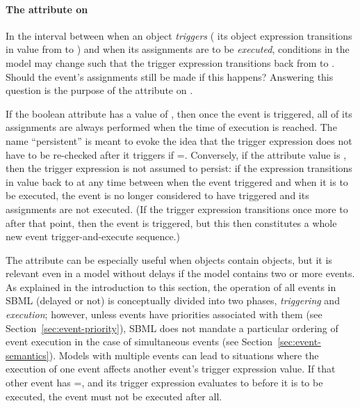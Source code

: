 \paragraph{The  attribute on }
\label{sec:trigger-persistent}

In the interval between when an \Event object \emph{triggers} (\ie
its \Trigger object expression transitions in value from
 to ) and when its assignments are to be
\emph{executed}, conditions in the model may change such that the
trigger expression transitions back from  to
.  Should the event's assignments still be made if this
happens?  Answering this question is the purpose of the
 attribute on \Trigger.

If the boolean attribute  has a value of
, then once the event is triggered, all of its assignments
are always performed when the time of execution is reached.  The
name ``persistent'' is meant to evoke the idea that the trigger
expression does not have to be re-checked after it triggers if
=.  Conversely, if the attribute value
is , then the trigger expression is not assumed to
persist: if the expression transitions in value back to
 at any time between when the event triggered and when it
is to be executed, the event is no longer considered to have triggered
and its assignments are not executed.  (If the trigger expression
transitions once more to  after that point, then the
event is triggered, but this then constitutes a whole new event
trigger-and-execute sequence.)

The  attribute can be especially useful when
\Event objects contain \Delay objects, but it is relevant even in
a model without delays if the model contains two or more events.
As explained in the introduction to this section, the operation of
all events in SBML (delayed or not) is conceptually divided into
two phases, \emph{triggering} and \emph{execution}; however, unless
events have priorities associated with them (see
Section~\ref{sec:event-priority}), SBML does not mandate a
particular ordering of event execution in the case of simultaneous
events (see Section~\ref{sec:event-semantics}).  Models with
multiple events can lead to situations where the execution of one
event affects another event's trigger expression value.  If that
other event has =, and its trigger
expression evaluates to  before it is to be executed,
the event must not be executed after all.


